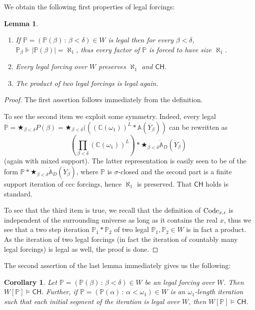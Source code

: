 \documentclass[a4paper,11pt]{article}
\newtheorem{lemma}[theorem]{Lemma}
\newtheorem{corollary}[theorem]{Corollary}
\newcommand{\forceP}{\mathbb{P}}
\newcommand{\CH}{\mathsf{CH}}
\begin{document}
 We obtain the following first properties of legal  forcings:
 \begin{lemma} 


\begin{enumerate}
\item If $\forceP=(\forceP(\beta) \, : \, \beta < \delta) \in W$ is legal  then for every $\beta < \delta$, $\forceP_{\beta} \Vdash| \forceP(\beta)|= \aleph_1$, thus every factor of $\forceP$ is forced to have size $\aleph_1$.
\item Every legal  forcing over $W$ preserves $\aleph_1$ and $\CH$.
\item The product of two legal  forcings is legal  again.
\end{enumerate}
\end{lemma}
\begin{proof}
The first assertion follows immediately from the definition.

To see the second item we exploit some symmetry.
Indeed, every legal  $\forceP = \bigstar_{\beta < \delta} P(\beta)= \bigstar_{\beta < \delta} ( ((\mathbb{C} (\omega_1))^L \ast \dot{\mathbb{A}} (\dot{Y_{\beta} }) )$ can be rewritten as \[(\prod_{\beta < \delta}  (\mathbb{C} (\omega_1))^L  )\ast \bigstar_{\beta < \delta}  \dot{\mathbb{A}}_D (\dot{Y}_{\beta} )\] (again with mixed support). The latter representation is easily seen to be of the form $\forceP \ast \bigstar_{\beta < \delta}  \dot{\mathbb{A}}_D(\dot{Y}_{\beta} )$, where $\forceP$ is $\sigma$-closed and the second part is a finite support iteration of ccc forcings, hence $\aleph_1$ is preserved. That $\CH$ holds is standard.

To see that the third item is true, we recall that the definition of $\hbox{Code} _{x,i}$ is independent of the surrounding universe as long as it contains the real $x$, thus we see that a two step iteration $\forceP_1 \ast \forceP_2$ of two legal  $\forceP_1, \forceP_2 \in W$ is in fact a product.  As the iteration of two legal  forcings (in fact the iteration of countably many legal  forcings) is legal  as well, the proof is done.
\end{proof}

The second assertion of the last lemma immediately gives us the following:
\begin{corollary}
Let $\forceP= (\forceP(\beta) \, : \, \beta < \delta) \in W$ be an legal  forcing over $W$. Then $W[\forceP] \models \CH$. Further, if $\forceP= (\forceP(\alpha) \, : \, \alpha < \omega_1) \in W$ is an $\omega_1$-length iteration such that each initial segment of the iteration is legal  over $W$, then $W[\forceP] \models \CH$.

\end{corollary}
\end{document}
